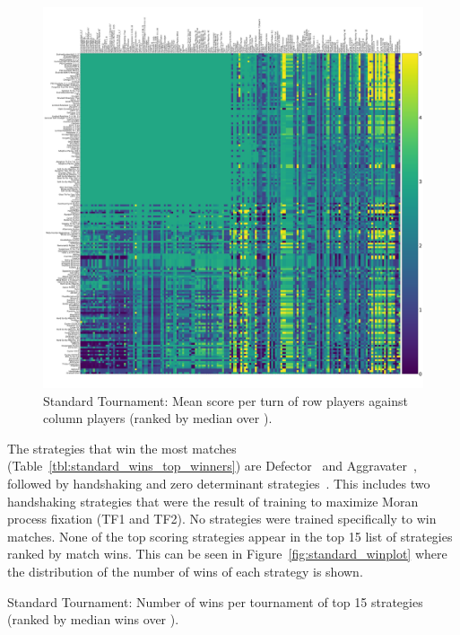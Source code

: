 \documentclass{article}
\begin{document}
\begin{figure}[!hbtp]
    \centering
    \includegraphics[width=\textwidth]{./assets/standard_scores_heatmap.pdf}
    \caption{Standard Tournament: Mean score per turn of row players against
    column players (ranked by median over
        \protecttournaments).}
    \label{fig:standard_heatmap}
\end{figure}

The strategies that win the most matches
(Table~\ref{tbl:standard_wins_top_winners}) are Defector~\cite{Axelrod1984} and Aggravater~\cite{axelrodproject}, followed
by handshaking and zero determinant strategies~\cite{Press2012}. 
This includes two handshaking
strategies that were the result of training to maximize Moran process fixation
(TF1 and TF2). No strategies were trained specifically to win matches. None of
the top scoring strategies appear in the top 15 list of strategies ranked by
match wins. This can be seen in Figure~\ref{fig:standard_winplot} where the
distribution of the number of wins of each strategy is shown.

\begin{table}[!hbtp]
    \centering
        
        \caption{Standard Tournament: Number of wins per tournament
        of top 15 strategies (ranked by median wins over
        \protecttournaments).}
        \label{tbl:standard_wins_top_winners}
\end{table}
\end{document}
